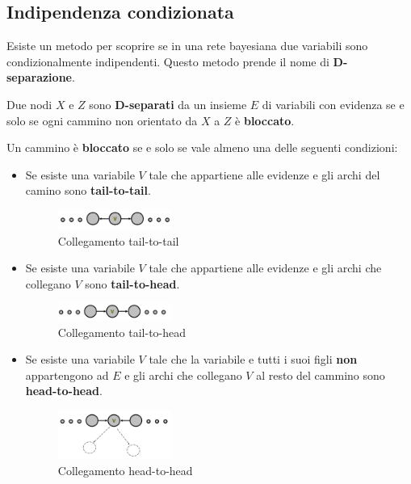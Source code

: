 \subsection{Indipendenza condizionata}
Esiste un metodo per scoprire se in una rete bayesiana due variabili sono
condizionalmente indipendenti. Questo metodo prende il nome di \textbf{D-separazione}.
\begin{definizione}
    Due nodi $X$ e $Z$ sono \textbf{D-separati} da un insieme $E$ di variabili con
    evidenza se e solo se ogni cammino non orientato da $X$ a $Z$ è \textbf{bloccato}.
\end{definizione}
\begin{definizione}
    Un cammino è \textbf{bloccato} se e solo se vale almeno una delle seguenti
    condizioni:
    \begin{itemize}
        \item Se esiste una variabile $V$ tale che appartiene alle evidenze e
              gli archi del camino sono \textbf{tail-to-tail}.
              \begin{figure}[!ht]
                  \centering
                  \includegraphics[width=0.35\textwidth]{./img/Reti/TailToTail.png}
                  \caption{Collegamento tail-to-tail}
                  \label{fig:tail-to-tail}
              \end{figure}
        \item Se esiste una variabile $V$ tale che appartiene alle evidenze e
              gli archi che collegano $V$ sono \textbf{tail-to-head}.
              \begin{figure}[!ht]
                  \centering
                  \includegraphics[width=0.35\textwidth]{./img/Reti/TailToHead.png}
                  \caption{Collegamento tail-to-head}
                  \label{fig:tail-to-head}
              \end{figure}
        \item Se esiste una variabile $V$ tale che la variabile e tutti i suoi figli
              \textbf{non} appartengono ad $E$ e gli archi che collegano $V$ al
              resto del cammino sono \textbf{head-to-head}.
              \begin{figure}[!ht]
                  \centering
                  \includegraphics[width=0.35\textwidth]{./img/Reti/HeadToHead.png}
                  \caption{Collegamento head-to-head}
                  \label{fig:head-to-head}
              \end{figure}
    \end{itemize}
\end{definizione}
